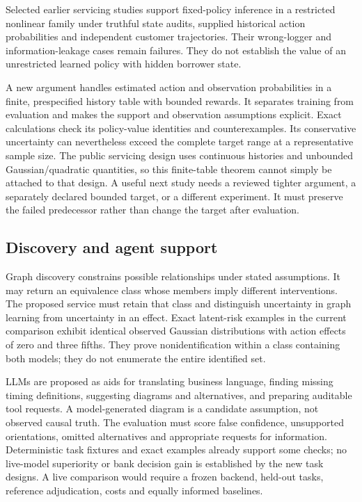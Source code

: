 Selected earlier servicing studies support fixed-policy inference in a
restricted nonlinear family under truthful state audits, supplied
historical action probabilities and independent customer trajectories.
Their wrong-logger and information-leakage cases remain failures. They
do not establish the value of an unrestricted learned policy with hidden
borrower state. \citep{sp13_servicing}

A new argument handles estimated action and observation probabilities in
a finite, prespecified history table with bounded rewards. It separates
training from evaluation and makes the support and observation
assumptions explicit. Exact calculations check its policy-value
identities and counterexamples. Its conservative uncertainty can
nevertheless exceed the complete target range at a representative sample
size. The public servicing design uses continuous histories and
unbounded Gaussian/quadratic quantities, so this finite-table theorem
cannot simply be attached to that design. A useful next study needs a
reviewed tighter argument, a separately declared bounded target, or a
different experiment. It must preserve the failed predecessor rather
than change the target after evaluation.
\citep{sp13_servicing_successor}

\hypertarget{discovery-and-agent-support}{%
\subsection{Discovery and agent
support}\label{discovery-and-agent-support}}

Graph discovery constrains possible relationships under stated
assumptions. It may return an equivalence class whose members imply
different interventions. The proposed service must retain that class and
distinguish uncertainty in graph learning from uncertainty in an effect.
Exact latent-risk examples in the current comparison exhibit identical
observed Gaussian distributions with action effects of zero and three
fifths. They prove nonidentification within a class containing both
models; they do not enumerate the entire identified set.
\citep{exec13_latent_examples}

LLMs are proposed as aids for translating business language, finding
missing timing definitions, suggesting diagrams and alternatives, and
preparing auditable tool requests. A model-generated diagram is a
candidate assumption, not observed causal truth. The evaluation must
score false confidence, unsupported orientations, omitted alternatives
and appropriate requests for information. Deterministic task fixtures
and exact examples already support some checks; no live-model
superiority or bank decision gain is established by the new task
designs. A live comparison would require a frozen backend, held-out
tasks, reference adjudication, costs and equally informed baselines.
\citep{sp13_public}

